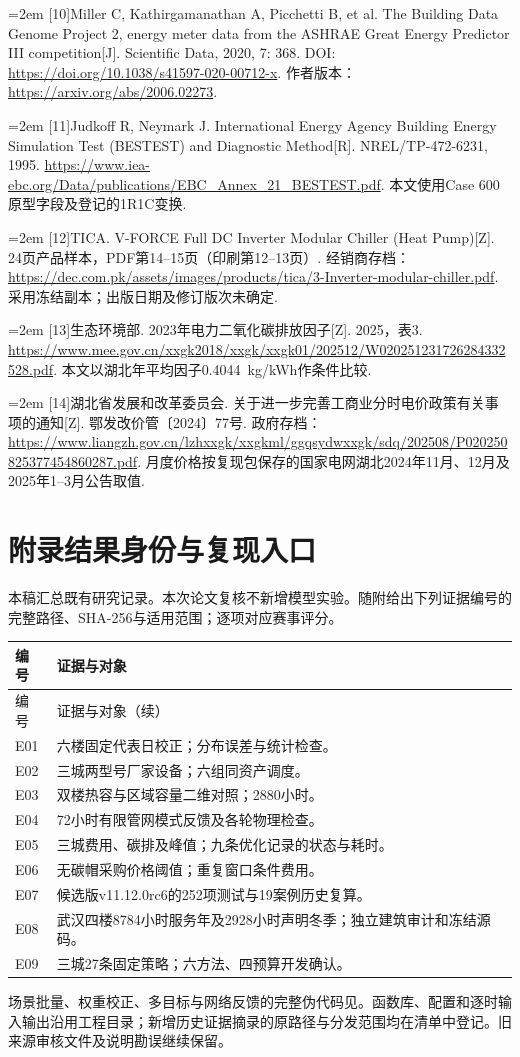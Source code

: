 \documentclass[12pt,a4paper]{article}
\newenvironment{refsectionflush}
  {\par\sloppy\setlength{\parindent}{0pt}\setlength{\parskip}{0pt}}
  {\par\fussy}
\newcommand{\refentry}[2]{%
  \par\noindent\hangindent=2em\hangafter=1
  [#1]\enspace #2\par}
\begin{document}
\begin{refsectionflush}
\refentry{10}{Miller C, Kathirgamanathan A, Picchetti B, et al. The Building Data Genome Project 2, energy meter data from the ASHRAE Great Energy Predictor III competition{[}J{]}. Scientific Data, 2020, 7: 368. DOI: \url{https://doi.org/10.1038/s41597-020-00712-x}. 作者版本：\url{https://arxiv.org/abs/2006.02273}.}
\refentry{11}{Judkoff R, Neymark J. International Energy Agency Building Energy Simulation Test (BESTEST) and Diagnostic Method{[}R{]}. NREL/TP-472-6231, 1995. \url{https://www.iea-ebc.org/Data/publications/EBC_Annex_21_BESTEST.pdf}. 本文使用Case 600原型字段及登记的1R1C变换.}
\refentry{12}{TICA. V-FORCE Full DC Inverter Modular Chiller (Heat Pump){[}Z{]}. 24页产品样本，PDF第14--15页（印刷第12--13页）. 经销商存档：\url{https://dec.com.pk/assets/images/products/tica/3-Inverter-modular-chiller.pdf}. 采用冻结副本；出版日期及修订版次未确定.}
\refentry{13}{生态环境部. 2023年电力二氧化碳排放因子{[}Z{]}. 2025，表3. \url{https://www.mee.gov.cn/xxgk2018/xxgk/xxgk01/202512/W020251231726284332528.pdf}. 本文以湖北年平均因子0.4044~kg/kWh作条件比较.}
\refentry{14}{湖北省发展和改革委员会. 关于进一步完善工商业分时电价政策有关事项的通知{[}Z{]}. 鄂发改价管〔2024〕77号. 政府存档：\url{https://www.liangzh.gov.cn/lzhxxgk/xxgkml/ggqsydwxxgk/sdq/202508/P020250825377454860287.pdf}. 月度价格按复现包保存的国家电网湖北2024年11月、12月及2025年1--3月公告取值.}
\end{refsectionflush}

\clearpage
\section*{附录\quad 结果身份与复现入口}
{}
本稿汇总既有研究记录。本次论文复核不新增模型实验。随附给出下列证据编号的完整路径、SHA-256与适用范围；逐项对应赛事评分。
\begin{longtable}{@{}p{}>{\raggedright\arraybackslash}p{}@{}}
\toprule 编号 & 证据与对象\\\midrule
\endfirsthead
\toprule 编号 & 证据与对象（续）\\\midrule
\endhead
\bottomrule\endfoot
E01 & 六楼固定代表日校正；分布误差与统计检查。\\
E02 & 三城两型号厂家设备；六组同资产调度。\\
E03 & 双楼热容与区域容量二维对照；2880小时。\\
E04 & 72小时有限管网模式反馈及各轮物理检查。\\
E05 & 三城费用、碳排及峰值；九条优化记录的状态与耗时。\\
E06 & 无碳帽采购价格阈值；重复窗口条件费用。\\
E07 & 候选版v11.12.0rc6的252项测试与19案例历史复算。\\
E08 & 武汉四楼8784小时服务年及2928小时声明冬季；独立建筑审计和冻结源码。\\
E09 & 三城27条固定策略；六方法、四预算开发确认。\\
\end{longtable}

场景批量、权重校正、多目标与网络反馈的完整伪代码见。函数库、配置和逐时输入输出沿用工程目录；新增历史证据摘录的原路径与分发范围均在清单中登记。旧来源审核文件及说明勘误继续保留。
\end{document}
